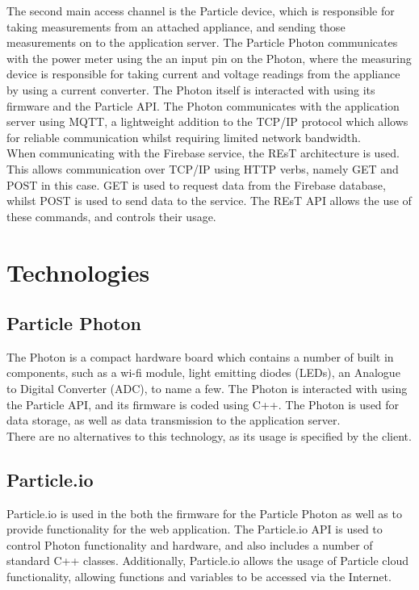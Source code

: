 \documentclass{article}
\begin{document}
	The second main access channel is the Particle device, which is 
	responsible for taking measurements from an attached appliance, and 
	sending those measurements on to the application server. The Particle 
	Photon communicates with the power meter using the an input pin on the Photon, 
	where the measuring device is responsible for taking current and 
	voltage readings from the appliance by using a current converter. The 
	Photon itself is interacted with using its firmware and the Particle 
	API. The Photon communicates with the application server using MQTT, 
	a lightweight addition to the TCP/IP protocol which allows for 
	reliable communication whilst requiring limited network bandwidth.\\
	
	When communicating with the Firebase service, the REsT architecture 
	is used. This allows communication over TCP/IP using HTTP verbs, 
	namely GET and POST in this case. GET is used to request data from 
	the Firebase database, whilst POST is used to send data to the 
	service. The REsT API allows the use of these commands, and controls 
	their usage.

\newpage

\section{Technologies}
	
	\subsection{Particle Photon}
	
	The Photon is a compact hardware board which contains a number of 
	built in components, such as a wi-fi module, light emitting diodes 
	(LEDs), an Analogue to Digital Converter (ADC), to name a few. The 
	Photon is interacted with using the Particle API, and its firmware is 
	coded using C++. The Photon is used for data storage, as well as data 
	transmission to the application server.\\
	
	\noindent
	There are no alternatives to this technology, as its usage is 
	specified by the client.
	
	\subsection{Particle.io}
	
	Particle.io is used in the both the firmware for the Particle Photon as well as to provide functionality for the web application. The Particle.io API is used to control Photon 
	functionality and hardware, and also includes a number of standard C++ classes. Additionally, Particle.io allows the usage of Particle cloud functionality, allowing functions and variables 
	to be accessed via the Internet.\\
	
\end{document}
